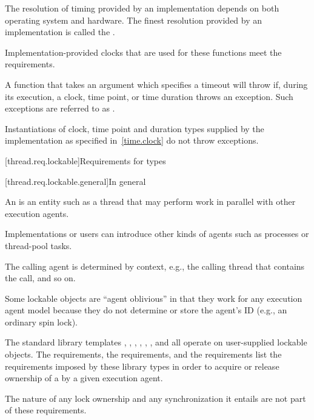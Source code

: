 \pnum
The resolution of timing provided by an implementation depends on both operating system
and hardware. The finest resolution provided by an implementation is called the
.

\pnum
Implementation-provided clocks that are used for these functions meet the
 requirements.

\pnum
A function that takes an argument which specifies a timeout will throw if,
during its execution, a clock, time point, or time duration throws an exception.
Such exceptions are referred to as .
\begin{note}
Instantiations of clock, time point and duration types supplied by
the implementation as specified in~\ref{time.clock} do not throw exceptions.
\end{note}

[thread.req.lockable]{Requirements for  types}

[thread.req.lockable.general]{In general}

\pnum
An  is an entity such as a thread that may perform work in parallel with
other execution agents.
\begin{note}
Implementations or users can introduce other kinds of
agents such as processes or thread-pool tasks.
\end{note}
The calling agent is determined by
context, e.g., the calling thread that contains the call, and so on.

\pnum
\begin{note}
Some lockable objects are ``agent oblivious'' in that they work for any
execution agent model because they do not determine or store the agent's ID (e.g., an
ordinary spin lock).
\end{note}

\pnum
The standard library templates ,
,
,
, ,
, and
 all operate on user-supplied
lockable objects. The  requirements, the  requirements,
and the  requirements list the requirements imposed by these library types
in order to acquire or release ownership of a  by a given execution agent.
\begin{note}
The nature of any lock ownership and any synchronization it entails are not part
of these requirements.
\end{note}

